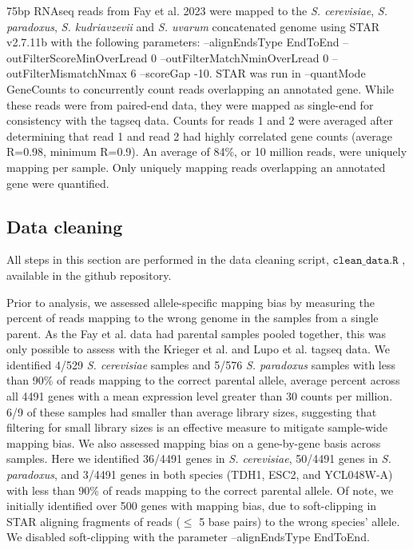 75bp RNAseq reads from Fay et al. 2023 were mapped to the \textit{S. cerevisiae}, \textit{S. paradoxus}, \textit{S. kudriavzevii} and \textit{S. uvarum} concatenated genome using STAR v2.7.11b with the following parameters: --alignEndsType EndToEnd --outFilterScoreMinOverLread 0  --outFilterMatchNminOverLread 0 --outFilterMismatchNmax 6  --scoreGap -10. STAR was run in --quantMode GeneCounts to concurrently count reads overlapping an annotated gene. While these reads were from paired-end data, they were mapped as single-end for consistency with the tagseq data. Counts for reads 1 and 2 were averaged after determining that read 1 and read 2 had highly correlated gene counts (average R=0.98, minimum R=0.9). An average of 84\%, or 10 million reads, were uniquely mapping per sample. Only uniquely mapping reads overlapping an annotated gene were quantified.

\subsection{Data cleaning}
All steps in this section are performed in the data cleaning script,  $\texttt{clean\_data.R}$ , available in the github repository. 

Prior to analysis, we assessed allele-specific mapping bias by measuring the percent of reads mapping to the wrong genome in the samples from a single parent. As the Fay et al. data had parental samples pooled together, this was only possible to assess with the Krieger et al. and Lupo et al. tagseq data. We identified 4/529 \textit{S. cerevisiae} samples and 5/576 \textit{S. paradoxus} samples with less than 90\% of reads mapping to the correct parental allele, average percent across all 4491 genes with a mean expression level greater than 30 counts per million. 6/9 of these samples had smaller than average library sizes, suggesting that filtering for small library sizes is an effective measure to mitigate sample-wide mapping bias. We also assessed mapping bias on a gene-by-gene basis across samples. Here we identified 36/4491 genes in \textit{S. cerevisiae}, 50/4491 genes in \textit{S. paradoxus}, and  3/4491 genes in both species (TDH1, ESC2, and YCL048W-A) with less than 90\% of reads mapping to the correct parental allele. Of note, we initially identified over 500 genes with mapping bias, due to soft-clipping in STAR aligning fragments of reads ($\leq$ 5 base pairs) to the wrong species' allele. We disabled soft-clipping with the parameter --alignEndsType EndToEnd. 

